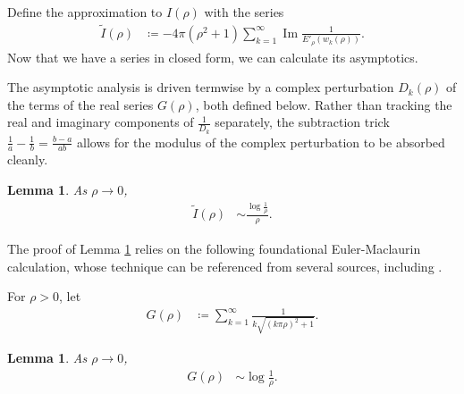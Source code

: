 \documentclass{amsart}
\theoremstyle{plain}
\numberwithin{theorem}{section}
\newtheorem{lemma}[theorem]{Lemma}
\DeclareMathOperator{\Imz}{Im}
\theoremstyle{definition}
\theoremstyle{remark}
\theoremstyle{brakets}
\begin{document}
Define the approximation to $I(\rho)$ with the series
\begin{align*}
\tilde{I}(\rho) &\coloneq -4\pi  (\rho^2 + 1) \sum\limits_{k=1}^{\infty}  \Imz \frac{1}{E'_\rho(w_k(\rho))}.
\end{align*}
\noindent Now that we have a series in closed form, we can calculate its asymptotics. 

The asymptotic analysis is driven termwise by a complex perturbation $D_k(\rho)$ of the terms of the real series $G(\rho)$, both defined below. Rather than tracking the real and imaginary components of $\frac{1}{D_k}$ separately, the subtraction trick $\frac{1}{a} - \frac{1}{b} = \frac{b-a}{ab}$ allows for the modulus of the complex perturbation to be absorbed cleanly.
\begin{lemma}\label{Itilde-asymp}
    As $\rho \to 0$,
    \begin{align*}
        \tilde{I}(\rho) &\sim \frac{\log \frac{1}{\rho}}{\rho}.
    \end{align*}
\end{lemma}

The proof of Lemma \ref{Itilde-asymp} relies on the following foundational Euler-Maclaurin calculation, whose technique can be referenced from several sources, including \cite{debruijn1981}.

For $\rho > 0$, let 
\begin{align*}
    G(\rho) &\coloneq \sum\limits_{k=1}^\infty \frac{1}{k\sqrt{(k\pi\rho)^2 + 1}}.
\end{align*}
\begin{lemma} \label{grhoasymptotics}
As $\rho \to 0$,
    \begin{align*}
        G(\rho) &\sim \log \frac{1}{\rho}.
    \end{align*}
\end{lemma}
\end{document}
